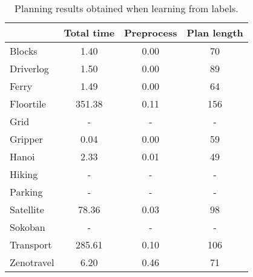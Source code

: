 \documentclass{article}
\begin{document}
\begin{table}
	\begin{footnotesize}
		\begin{center}
			\begin{tabular}{l|c|c|c|}			
				& Total time & Preprocess & Plan length  \\
				\hline
				Blocks & 1.40 & 0.00 & 70  \\
				Driverlog & 1.50 & 0.00 & 89 \\
				Ferry & 1.49 & 0.00 & 64 \\
				Floortile & 351.38 & 0.11 & 156 \\
				Grid & - & - & - \\ %
				Gripper & 0.04 & 0.00 & 59 \\
				Hanoi & 2.33 & 0.01 & 49  \\
				Hiking & - & - & - \\ %
				Parking & - & - & - \\ %
				Satellite & 78.36 & 0.03 & 98 \\
				Sokoban & - & - & - \\ %
				Transport & 285.61 & 0.10 & 106 \\
				Zenotravel & 6.20 & 0.46 & 71 \\
			\end{tabular}
		\end{center}
	\end{footnotesize}
 \caption{\small Planning results obtained when learning from labels.}
\label{fig:planlabels}                        
\end{table}







\end{document}
